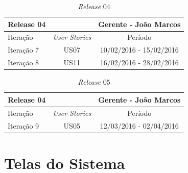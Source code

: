 \documentclass[a4paper,12pt]{monografia}
\begin{document}
\begin{table}[H]
\centering
\caption{\textit{Release} 04}
\label{qua:release04}
\begin{tabular}{|lc|c|}
\rowcolor{ballblue}
\hline
\textbf{Release 04} & & Gerente - João Marcos \\
\hline
Iteração & \textit{\textit{User Stories}} & Período\\
\hline
Iteração 7    & US07  & 10/02/2016 - 15/02/2016\\
Iteração 8    & US11  & 16/02/2016 - 28/02/2016\\
\hline
\end{tabular}
\end{table}

\begin{table}[H]
\centering
\caption{\textit{Release} 05}
\label{qua:release05}
\begin{tabular}{|lc|c|}
\rowcolor{ballblue}
\hline
\textbf{Release 04} & & Gerente - João Marcos \\
\hline
Iteração & \textit{\textit{User Stories}} & Período\\
\hline
Iteração 9    & US05  & 12/03/2016 - 02/04/2016\\
\hline
\end{tabular}
\end{table}


\chapter{Telas do Sistema} %
\label{cha:telas_do_sistema}

\end{document}
